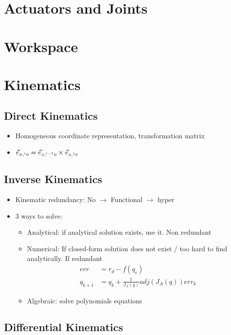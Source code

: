 \section{Actuators and Joints}
\section{Workspace}

\section{Kinematics}
\subsection{Direct Kinematics}
\begin{itemize}
	\item Homogeneous coordinate representation, transformation matrix
	\item $\vec{e}_{x, \prescript{i}{}{o}} = \vec{e}_{z, \prescript{i-1}{}{o}} \times \vec{e}_{z, \prescript{i}{}{o}}$
\end{itemize}

\subsection{Inverse Kinematics}
\begin{itemize}
	\item Kinematic redundancy: No $\rightarrow$ Functional $\rightarrow$ hyper
	\item 3 ways to solve:
	\begin{itemize}
		\item Analytical: if analytical solution exists,  use it. Non redundant
		\item Numerical: If closed-form solution does not exist / too hard to find analytically. If redundant
		\begin{align*}
			err &= r_d - f(q_e)\\
			q_{k+1} &= q_k + \frac{1}{J_A(q)} adj(J_A(q)) err_k
		\end{align*}
		\item Algebraic: solve polynomials equations
	\end{itemize}
\end{itemize}

\subsection{Differential Kinematics}
{\color{red} }

